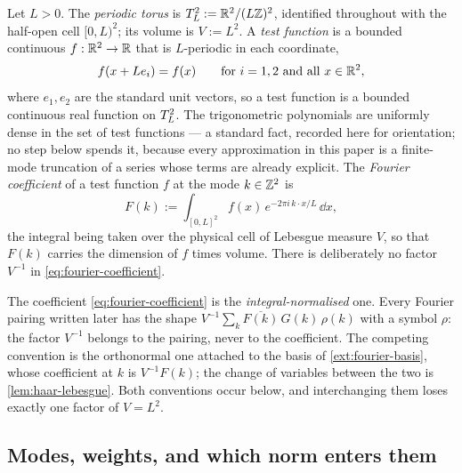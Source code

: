 \begin{definition}\label{def:torus}
Let $L>0$. The \emph{periodic torus} is $T_L^2:=\mathbb{R}^2/(L\mathbb{Z})^2$, identified
throughout with the half-open cell $[0,L)^2$; its volume is $V:=L^2$. A
\emph{test function} is a bounded continuous $f:\mathbb{R}^2\to\mathbb{R}$ that is
$L$-periodic in each coordinate,
\[
  f(x+Le_i)=f(x)\qquad\text{for } i=1,2 \text{ and all } x\in\mathbb{R}^2 ,
\]
where $e_1,e_2$ are the standard unit vectors, so a test function is a bounded
continuous real function on $T_L^2$. The
trigonometric polynomials are uniformly dense in the set of test functions ---
a standard fact, recorded here for orientation; no step below spends it, because
every approximation in this paper is a finite-mode truncation of a series whose
terms are already explicit. The \emph{Fourier coefficient} of
a test function $f$ at the mode $k\in\mathbb{Z}^2$ is
\begin{equation}\label{eq:fourier-coefficient}
  F(k):=\int_{[0,L]^2} f(x)\,e^{-2\pi i\,k\cdot x/L}\,\dd x ,
\end{equation}
the integral being taken over the physical cell of Lebesgue measure $V$, so that
$F(k)$ carries the dimension of $f$ times volume. There is deliberately no
factor $V^{-1}$ in \eqref{eq:fourier-coefficient}.
\end{definition}

\begin{remark}\label{rem:v-normalisation}
The coefficient \eqref{eq:fourier-coefficient} is the \emph{integral-normalised}
one. Every Fourier pairing written later has the shape
$V^{-1}\sum_k\overline{F(k)}\,G(k)\,\rho(k)$ with a symbol $\rho$: the factor
$V^{-1}$ belongs to the pairing, never to the coefficient. The competing
convention is the orthonormal one attached to the basis of
\cref{ext:fourier-basis}, whose coefficient at $k$ is $V^{-1}F(k)$; the change of
variables between the two is \cref{lem:haar-lebesgue}. Both conventions occur
below, and interchanging them loses exactly one factor of $V=L^2$.
\end{remark}

\subsection{Modes, weights, and which norm enters them}

